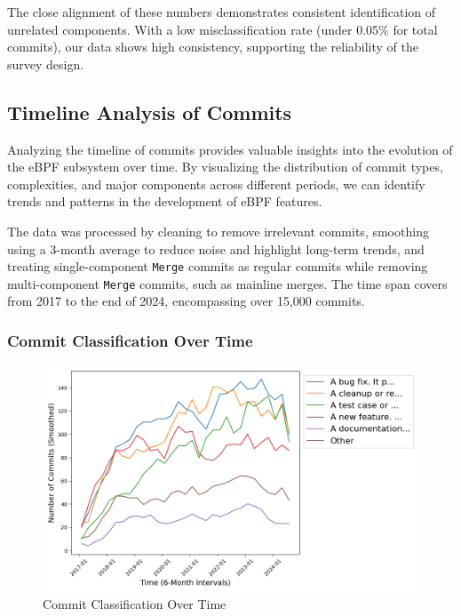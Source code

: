 The close alignment of these numbers demonstrates consistent identification of unrelated components. With a low misclassification rate (under 0.05\% for total commits), our data shows high consistency, supporting the reliability of the survey design.

\subsection{Timeline Analysis of Commits}

Analyzing the timeline of commits provides valuable insights into the evolution of the eBPF subsystem over time. By visualizing the distribution of commit types, complexities, and major components across different periods, we can identify trends and patterns in the development of eBPF features.

The data was processed by cleaning to remove irrelevant commits, smoothing using a 3-month average to reduce noise and highlight long-term trends, and treating single-component \texttt{Merge} commits as regular commits while removing multi-component \texttt{Merge} commits, such as mainline merges. The time span covers from 2017 to the end of 2024, encompassing over 15,000 commits.

\subsubsection{Commit Classification Over Time}

\begin{figure}[ht]
    \centering
    \includegraphics[width=\linewidth]{feature-analysis/timeline_commit_classification_smoothed.png}
    \caption{Commit Classification Over Time}
    \label{fig:timeline_commit_classification_smoothed}
\end{figure}

